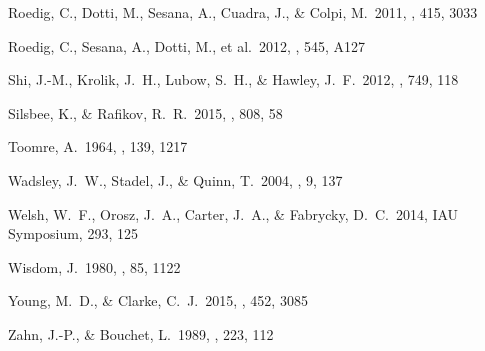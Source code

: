  Roedig, C., Dotti, M., Sesana, A., Cuadra, J., \& Colpi, M.\ 2011, \mnras, 415, 3033


 Roedig, C., Sesana, A., Dotti, M., et al.\ 2012, \aap, 545, A127

 Shi, J.-M., Krolik, J.~H., Lubow, S.~H., \& Hawley, J.~F.\ 2012, \apj, 749, 118


 Silsbee, K., \& Rafikov, R.~R.\ 2015, \apj, 808, 58


 Toomre, A.\ 1964, \apj, 139, 
1217


 Wadsley, J.~W., Stadel, 
J., \& Quinn, T.\ 2004, \na, 9, 137

 Welsh, W.~F., Orosz, J.~A., Carter, J.~A., \& Fabrycky, D.~C.\ 2014, IAU Symposium, 293, 125


 Wisdom, J.\ 1980, \aj, 85, 1122 


 Young, M.~D., \& Clarke, C.~J.\ 2015, \mnras, 452, 3085


 Zahn, J.-P., \& Bouchet, L.\ 1989, \aap, 223, 112
